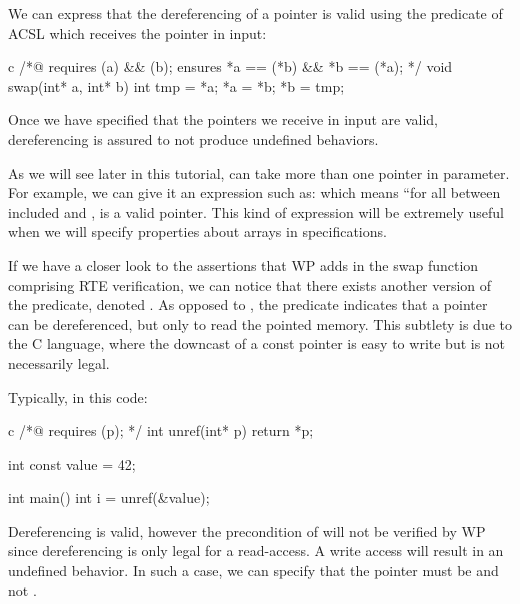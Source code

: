 \documentclass[middle]{zmdocument}
\begin{document}
We can express that the dereferencing of a pointer is valid using the
 predicate of ACSL which receives the
pointer in input:



\begin{CodeBlock}{c}
/*@
  requires \valid(a) && \valid(b);
  ensures  *a == \old(*b) && *b == \old(*a);
*/
void swap(int* a, int* b){
  int tmp = *a;
  *a = *b;
  *b = tmp;
}
\end{CodeBlock}



Once we have specified that the pointers we receive in input are valid,
dereferencing is assured to not produce undefined behaviors.



As we will see later in this tutorial, 
can take more than one pointer in parameter. For example, we can give it
an expression such as:  which means
``for all  between included  and ,
 is a valid pointer. This kind of expression will be
extremely useful when we will specify properties about arrays in
specifications.



If we have a closer look to the assertions that WP adds in the swap
function comprising RTE verification, we can notice that there exists
another version of the  predicate, denoted
. As opposed to , the
predicate  indicates that a pointer
can be dereferenced, but only to read the pointed memory. This subtlety
is due to the C language, where the downcast of a const pointer is easy
to write but is not necessarily legal.



Typically, in this code:


\begin{CodeBlock}{c}
/*@ requires \valid(p); */
int unref(int* p){
  return *p;
}

int const value = 42;

int main(){
  int i = unref(&value);
}
\end{CodeBlock}



Dereferencing  is valid, however the precondition of
 will not be verified by WP since dereferencing
 is only legal for a read-access. A write access will
result in an undefined behavior. In such a case, we can specify that the
pointer  must be  and not
.
\end{document}

